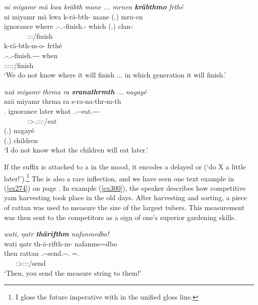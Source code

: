 \begin{exe}
	\ex \emph{ni miyamr mä kwa kräbth mane ... mrnen \textbf{kräbthmo} frthé}\\
	\glll ni miyamr mä kwa k-rä-bth-\Zero{} mane (.) mrn-en\\
	{\Fnsg} ignorance where {\Fut} \M.\Bet-\Irr.\Vc.\Ndu-finish.\Rs-\Stsg{} which (.) clan-{\Loc}\\
	~ ~ ~ ~ {\footnotesize \Stsg:\Sbj:\Irr:\Pfv/finish} ~ ~ ~\\
	\sn
	\glll k-rä-bth-m-o-\Zero{} frthé\\
	\M.\Bet-\Irr.\Vc.\Ndu-finish.\Rs-\Dur-\Andat-{\Sg} when\\
	{\footnotesize \Sg:\Sbj:\Irr:\Pfv:\Bg:\Andat/finish} ~\\
	\trans `We do not know where it will finish ... in which generation it will finish.'\\ 
	\label{ex298}
\end{exe}
\begin{exe}
	\ex \emph{nzä miyamr thrma ra \textbf{sranathrmth} ... nagayé}\\
	\glll nzä miyamr thrma ra s-ra-na-thr-m-th\\
	\Fsg.{\Abs} ignorance later what \Tsg.\Masc.\Bet-\Irr-eat.\Ext-\Ndu-\Dur-\Stnsg{}\\
	~ ~ ~ ~ {\footnotesize \Stpl:\Sbj>\Tsg.\Masc:\Obj:\Irr:\Ipfv:\Bg/eat}\\
	\sn
	\gll (.) nagayé\\
	(.) children\\
	\trans `I do not know what the children will eat later.' 
	\label{ex299}
\end{exe}

If the  suffix is attached to a  in the  mood, it encodes a delayed or   (`do X a little later!').\footnote{I gloss the future imperative with \Futimp{} in the unified gloss line.} The   is also a rare inflection, and we have seen one text example in (\ref{ex274}) on page \pageref{ex274}. In example (\ref{ex300}), the speaker describes how competitive yam harvesting took place in the old days. After harvesting and sorting, a piece of rattan was used to measure the size of the largest tubers. This measurement was then sent to the competitors as a sign of one's superior gardening skills.

\begin{exe}
 	\ex \emph{wati, ŋatr \textbf{thärifthm} nafanmedbo!}\\
 	\glll wati ŋatr th-ä-rifth-m-\Zero{} nafanme=dbo\\
 	then rattan \Stnsg.\Bet-\Ndu-send.\Rs-\Dur-\Ssg.{\Imp} \Tnsg=\All.{\Sg}\\
	~ ~ {\footnotesize \Ssg:\Sbj>\Stpl:\Obj:\Futimp:\Pfv/send} ~\\
 	\trans `Then, you send the measure string to them!' 
 	\label{ex300}
\end{exe}

